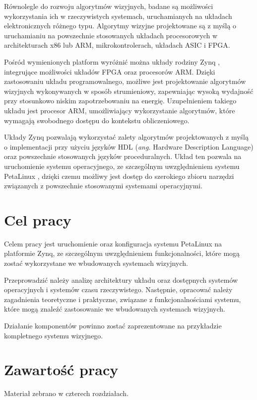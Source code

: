 Równolegle do rozwoju algorytmów wizyjnych, badane są możliwości wykorzystania ich w rzeczywistych systemach, uruchamianych na układach elektronicznych różnego typu. Algorytmy wizyjne projektowane są z myślą o uruchamianiu na powszechnie stosowanych układach procesorowych w architekturach x86 lub ARM, mikrokontrolerach, układach ASIC i FPGA.

Pośród wymienionych platform wyróżnić można układy rodziny Zynq \cite{zybo-reference-manual}, integrujące możliwości układów FPGA oraz procesorów ARM. Dzięki zastosowaniu układu programowalnego, możliwe jest projektowanie algorytmów wizyjnych wykonywanych w sposób strumieniowy, zapewniając wysoką wydajność przy stosunkowo niskim zapotrzebowaniu na energię. Uzupełnieniem takiego układu jest procesor ARM, umożliwiający wykorzystanie algorytmów, które wymagają swobodnego dostępu do kontekstu obliczeniowego.

Układy Zynq pozwalają wykorzystać zalety algorytmów projektowanych z myślą o implementacji przy użyciu języków HDL (\emph{ang.} Hardware Description Language) oraz powszechnie stosowanych języków proceduralnych. Układ ten pozwala na uruchomienie systemu operacyjnego, ze szczególnym uwzględnieniem systemu PetaLinux \cite{petalinux-tools}, dzięki czemu możliwy jest dostęp do szerokiego zbioru narzędzi związanych z powszechnie stosowanymi systemami operacyjnymi.

\section{Cel pracy}
Celem pracy jest uruchomienie oraz konfiguracja systemu PetaLinux na platformie Zynq, ze szczególnym uwzględnieniem funkcjonalności, które mogą zostać wykorzystane we wbudowanych systemach wizyjnych. 

Przeprowadzić należy analizę architektury układu oraz dostępnych systemów operacyjnych i systemów czasu rzeczywistego. Następnie, opracować należy zagadnienia teoretyczne i praktyczne, związane z funkcjonalnościami systemu, które mogą znaleźć zastosowanie we wbudowanych systemach wizyjnych.

Działanie komponentów powinno zostać zaprezentowane na przykładzie kompletnego systemu wizyjnego.

\section{Zawartość pracy}

Materiał zebrano w czterech rozdziałach.

